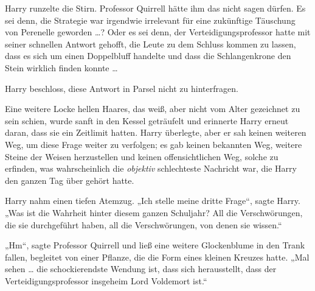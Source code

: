 Harry runzelte die Stirn.
Professor Quirrell hätte ihm das nicht sagen dürfen. Es sei denn, die Strategie war irgendwie irrelevant für eine zukünftige Täuschung von Perenelle geworden …? Oder es sei denn, der Verteidigungsprofessor hatte mit seiner schnellen Antwort gehofft, die Leute zu dem Schluss kommen zu lassen, dass es sich um einen Doppelbluff handelte und dass die Schlangenkrone den Stein wirklich finden konnte …

Harry beschloss, diese Antwort in Parsel nicht zu hinterfragen.

Eine weitere Locke hellen Haares, das weiß, aber nicht vom Alter gezeichnet zu sein schien, wurde sanft in den Kessel geträufelt und erinnerte Harry erneut daran, dass sie ein Zeitlimit hatten.
Harry überlegte, aber er sah keinen weiteren Weg, um diese Frage weiter zu verfolgen; es gab keinen bekannten Weg, weitere Steine der Weisen herzustellen und keinen offensichtlichen Weg, solche zu erfinden, was wahrscheinlich die \emph{objektiv} schlechteste Nachricht war, die Harry den ganzen Tag über gehört hatte.

Harry nahm einen tiefen Atemzug.
„Ich stelle meine dritte Frage“, sagte Harry.
„Was ist die Wahrheit hinter diesem ganzen Schuljahr? All die Verschwörungen, die sie durchgeführt haben, all die Verschwörungen, von denen sie wissen.“

„Hm“, sagte Professor Quirrell und ließ eine weitere Glockenblume in den Trank fallen, begleitet von einer Pflanze, die die Form eines kleinen Kreuzes hatte.
„Mal sehen … die schockierendste Wendung ist, dass sich herausstellt, dass der Verteidigungsprofessor insgeheim Lord Voldemort ist.“

